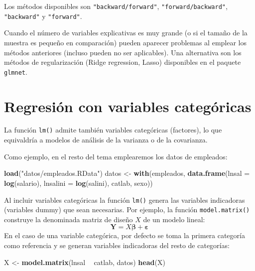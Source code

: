 \documentclass[]{book}
\newenvironment{Shaded}{\begin{snugshade}}{\end{snugshade}}
\newcommand{\KeywordTok}[1]{\textcolor[rgb]{0.13,0.29,0.53}{\textbf{#1}}}
\newcommand{\DataTypeTok}[1]{\textcolor[rgb]{0.13,0.29,0.53}{#1}}
\newcommand{\StringTok}[1]{\textcolor[rgb]{0.31,0.60,0.02}{#1}}
\newcommand{\OperatorTok}[1]{\textcolor[rgb]{0.81,0.36,0.00}{\textbf{#1}}}
\newcommand{\NormalTok}[1]{#1}
\begin{document}
Los métodos disponibles son \texttt{"backward/forward"},
\texttt{"forward/backward"}, \texttt{"backward"} y \texttt{"forward"}.

Cuando el número de variables explicativas es muy grande (o si el tamaño
de la muestra es pequeño en comparación) pueden aparecer problemas al
emplear los métodos anteriores (incluso pueden no ser aplicables). Una
alternativa son los métodos de regularización (Ridge regression, Lasso)
disponibles en el paquete \texttt{glmnet}.

\section{Regresión con variables
categóricas}\label{regresion-con-variables-categoricas}

La función \texttt{lm()} admite también variables categóricas
(factores), lo que equivaldría a modelos de análisis de la varianza o de
la covarianza.

Como ejemplo, en el resto del tema emplearemos los datos de empleados:

\begin{Shaded}
\begin{Highlighting}[]
\KeywordTok{load}\NormalTok{(}\StringTok{"datos/empleados.RData"}\NormalTok{)}
\NormalTok{datos <-}\StringTok{ }\KeywordTok{with}\NormalTok{(empleados, }\KeywordTok{data.frame}\NormalTok{(}\DataTypeTok{lnsal =} \KeywordTok{log}\NormalTok{(salario), }\DataTypeTok{lnsalini =} \KeywordTok{log}\NormalTok{(salini), catlab, sexo))}
\end{Highlighting}
\end{Shaded}

Al incluir variables categóricas la función \texttt{lm()} genera las
variables indicadoras (variables dummy) que sean necesarias. Por
ejemplo, la función \texttt{model.matrix()} construye la denominada
matriz de diseño \(X\) de un modelo lineal:
\[\mathbf{Y}=X\mathbf{\beta}+\mathbf{\varepsilon}\] En el caso de una
variable categórica, por defecto se toma la primera categoría como
referencia y se generan variables indicadoras del resto de categorías:

\begin{Shaded}
\begin{Highlighting}[]
\NormalTok{X <-}\StringTok{ }\KeywordTok{model.matrix}\NormalTok{(lnsal }\OperatorTok{~}\StringTok{ }\NormalTok{catlab, datos)}
\KeywordTok{head}\NormalTok{(X)}
\end{Highlighting}
\end{Shaded}
\end{document}
